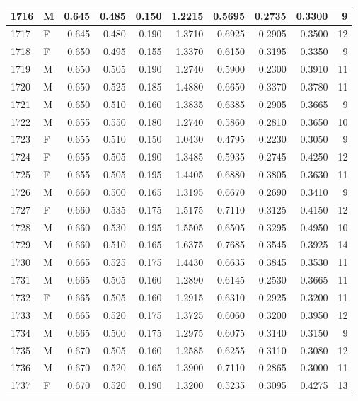 \documentclass[9pt,twocolumn,twoside,]{pnas-new}
\begin{document}
\begin{tabular}{l|l|r|r|r|r|r|r|r|r}
\hline
1716 & M & 0.645 & 0.485 & 0.150 & 1.2215 & 0.5695 & 0.2735 & 0.3300 & 9\\
\hline
1717 & F & 0.645 & 0.480 & 0.190 & 1.3710 & 0.6925 & 0.2905 & 0.3500 & 12\\
\hline
1718 & F & 0.650 & 0.495 & 0.155 & 1.3370 & 0.6150 & 0.3195 & 0.3350 & 9\\
\hline
1719 & M & 0.650 & 0.505 & 0.190 & 1.2740 & 0.5900 & 0.2300 & 0.3910 & 11\\
\hline
1720 & M & 0.650 & 0.525 & 0.185 & 1.4880 & 0.6650 & 0.3370 & 0.3780 & 11\\
\hline
1721 & M & 0.650 & 0.510 & 0.160 & 1.3835 & 0.6385 & 0.2905 & 0.3665 & 9\\
\hline
1722 & M & 0.655 & 0.550 & 0.180 & 1.2740 & 0.5860 & 0.2810 & 0.3650 & 10\\
\hline
1723 & F & 0.655 & 0.510 & 0.150 & 1.0430 & 0.4795 & 0.2230 & 0.3050 & 9\\
\hline
1724 & F & 0.655 & 0.505 & 0.190 & 1.3485 & 0.5935 & 0.2745 & 0.4250 & 12\\
\hline
1725 & F & 0.655 & 0.505 & 0.195 & 1.4405 & 0.6880 & 0.3805 & 0.3630 & 11\\
\hline
1726 & M & 0.660 & 0.500 & 0.165 & 1.3195 & 0.6670 & 0.2690 & 0.3410 & 9\\
\hline
1727 & F & 0.660 & 0.535 & 0.175 & 1.5175 & 0.7110 & 0.3125 & 0.4150 & 12\\
\hline
1728 & M & 0.660 & 0.530 & 0.195 & 1.5505 & 0.6505 & 0.3295 & 0.4950 & 10\\
\hline
1729 & M & 0.660 & 0.510 & 0.165 & 1.6375 & 0.7685 & 0.3545 & 0.3925 & 14\\
\hline
1730 & M & 0.665 & 0.525 & 0.175 & 1.4430 & 0.6635 & 0.3845 & 0.3530 & 11\\
\hline
1731 & M & 0.665 & 0.505 & 0.160 & 1.2890 & 0.6145 & 0.2530 & 0.3665 & 11\\
\hline
1732 & F & 0.665 & 0.505 & 0.160 & 1.2915 & 0.6310 & 0.2925 & 0.3200 & 11\\
\hline
1733 & M & 0.665 & 0.520 & 0.175 & 1.3725 & 0.6060 & 0.3200 & 0.3950 & 12\\
\hline
1734 & M & 0.665 & 0.500 & 0.175 & 1.2975 & 0.6075 & 0.3140 & 0.3150 & 9\\
\hline
1735 & M & 0.670 & 0.505 & 0.160 & 1.2585 & 0.6255 & 0.3110 & 0.3080 & 12\\
\hline
1736 & M & 0.670 & 0.520 & 0.165 & 1.3900 & 0.7110 & 0.2865 & 0.3000 & 11\\
\hline
1737 & F & 0.670 & 0.520 & 0.190 & 1.3200 & 0.5235 & 0.3095 & 0.4275 & 13\\

\end{tabular}
\end{document}
